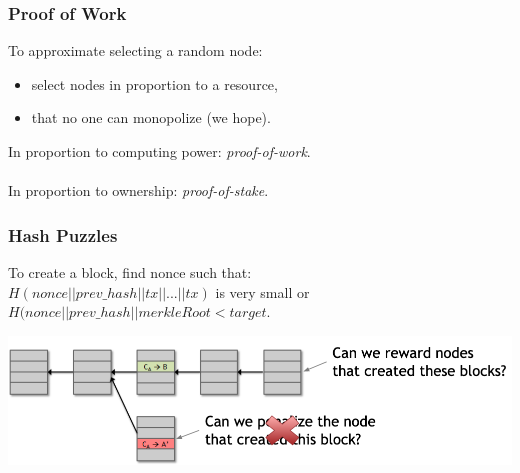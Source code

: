 \documentclass{beamer}
\begin{document}
\begin{frame}
  \frametitle{Proof of Work}
  To approximate selecting a random node: 
	\begin{itemize}
		\item select nodes in proportion to a resource,
    		\item that no one can monopolize (we hope).
	\end{itemize}
	\pause
	In proportion to computing power: \emph{proof-of-work}. \\ $ $ \\
In proportion to ownership: \emph{proof-of-stake}.

\end{frame}
\begin{frame}
  \frametitle{Hash Puzzles}
  To create a block, find nonce such that: \\
  $H(nonce || prev\_hash || tx || ... || tx)$ is very small or \\
     $H(nonce || prev\_hash || merkleRoot < target$.
  
  \centering
	\includegraphics[scale=0.7]{incentives}

\end{frame}

\end{document}
